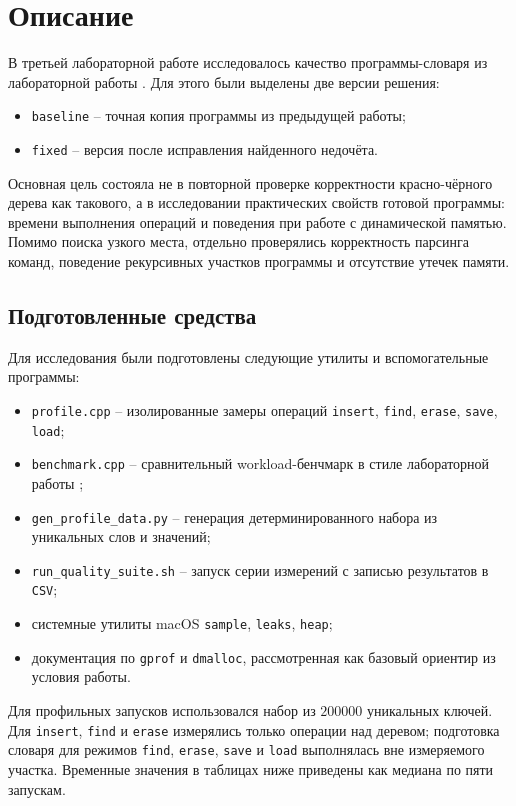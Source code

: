\section{Описание}

В третьей лабораторной работе исследовалось качество программы-словаря из лабораторной работы . Для этого были выделены две версии решения:
\begin{itemize}
\item \texttt{baseline} -- точная копия программы из предыдущей работы;
\item \texttt{fixed} -- версия после исправления найденного недочёта.
\end{itemize}

Основная цель состояла не в повторной проверке корректности красно-чёрного дерева как такового, а в исследовании практических свойств готовой программы: времени выполнения операций и поведения при работе с динамической памятью.
Помимо поиска узкого места, отдельно проверялись корректность парсинга команд, поведение рекурсивных участков программы и отсутствие утечек памяти.

\subsection{Подготовленные средства}

Для исследования были подготовлены следующие утилиты и вспомогательные программы:
\begin{itemize}
\item \texttt{profile.cpp} -- изолированные замеры операций \texttt{insert}, \texttt{find}, \texttt{erase}, \texttt{save}, \texttt{load};
\item \texttt{benchmark.cpp} -- сравнительный workload-бенчмарк в стиле лабораторной работы ;
\item \texttt{gen\_profile\_data.py} -- генерация детерминированного набора из уникальных слов и значений;
\item \texttt{run\_quality\_suite.sh} -- запуск серии измерений с записью результатов в \texttt{CSV};
\item системные утилиты macOS \texttt{sample}, \texttt{leaks}, \texttt{heap};
\item документация по \texttt{gprof} и \texttt{dmalloc}, рассмотренная как базовый ориентир из условия работы.
\end{itemize}

Для профильных запусков использовался набор из \(200000\) уникальных ключей. Для \texttt{insert}, \texttt{find} и \texttt{erase} измерялись только операции над деревом; подготовка словаря для режимов \texttt{find}, \texttt{erase}, \texttt{save} и \texttt{load} выполнялась вне измеряемого участка. Временные значения в таблицах ниже приведены как медиана по пяти запускам.

